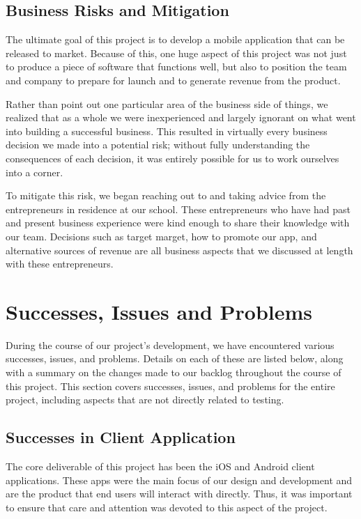 \subsection{Business Risks and Mitigation}

The ultimate goal of this project is to develop a mobile application that can be
released to market. Because of this, one huge aspect of this project was not
just to produce a piece of software that functions well, but also to position
the team and company to prepare for launch and to generate revenue from the
product.

Rather than point out one particular area of the business side of things, we
realized that as a whole we were inexperienced and largely ignorant on what went
into building a successful business. This resulted in virtually every business
decision we made into a potential risk; without fully understanding the
consequences of each decision, it was entirely possible for us to work ourselves
into a corner.

To mitigate this risk, we began reaching out to and taking advice from the
entrepreneurs in residence at our school. These entrepreneurs who have had
past and present business experience were kind enough to share their knowledge
with our team. Decisions such as target marget, how to promote our app, and
alternative sources of revenue are all business aspects that we discussed at
length with these entrepreneurs.



\section{Successes, Issues and Problems}

During the course of our project's development, we have encountered various
successes, issues, and problems. Details on each of these are listed below,
along with a summary on the changes made to our backlog throughout the course of
this project. This section covers successes, issues, and problems for the entire
project, including aspects that are not directly related to testing.


\subsection{Successes in Client Application}

The core deliverable of this project has been the iOS and Android client
applications. These apps were the main focus of our design and development and
are the product that end users will interact with directly. Thus, it was
important to ensure that care and attention was devoted to this aspect of the
project.

